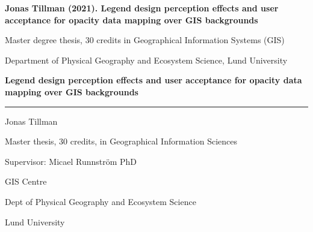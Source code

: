 
   



\setcounter{page}{2}


\textbf{Jonas Tillman (2021). Legend design perception effects and user acceptance for opacity data mapping over GIS backgrounds}

Master degree thesis, 30 credits in Geographical Information Systems (GIS) 

Department of Physical Geography and Ecosystem Science, Lund University

\newpage



\begin{center}
    \vspace*{1cm}
        
    \Huge
    \textbf{Legend design perception effects and user acceptance for opacity data mapping over GIS backgrounds}
        
        
    \vspace{5cm}
        
    \rule{15cm}{1.0pt}

    \Large
    Jonas Tillman

    Master thesis, 30 credits, in Geographical Information Sciences
    
    \vspace{2cm}
    
    Supervisor: Micael Runnström PhD

    GIS Centre
    
    Dept of Physical Geography and Ecosystem Science
    
    Lund University
                    
\end{center}

\newpage

